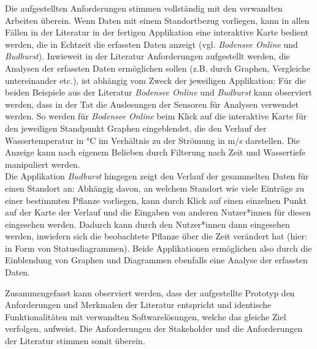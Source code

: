 Die aufgestellten Anforderungen stimmen vollständig mit den verwandten Arbeiten überein. Wenn Daten mit einem Standortbezug vorliegen, kann in allen Fällen in der Literatur in der fertigen Applikation eine interaktive Karte bedient werden, die in Echtzeit die erfassten Daten anzeigt (vgl. \textit{Bodensee Online} und \textit{Budburst}). Inwieweit in der Literatur Anforderungen aufgestellt werden, die Analysen der erfassten Daten ermöglichen sollen (z.B. durch Graphen, Vergleiche untereinander etc.), ist abhängig vom Zweck der jeweiligen Applikation: Für die beiden Beispiele aus der Literatur \textit{Bodensee Online} und \textit{Budburst} kann observiert werden, dass in der Tat die Auslesungen der Sensoren für Analysen verwendet werden. So werden für \textit{Bodensee Online} beim Klick auf die interaktive Karte für den jeweiligen Standpunkt Graphen eingeblendet, die den Verlauf der Wassertemperatur in °C im Verhältnis zu der Strömung in m/s darstellen. Die Anzeige kann nach eigenem Belieben durch Filterung nach Zeit und Wassertiefe manipuliert werden. \\ Die Applikation \textit{Budburst} hingegen zeigt den Verlauf der gesammelten Daten für einen Standort an: Abhängig davon, an welchem Standort wie viele Einträge zu einer bestimmten Pflanze vorliegen, kann durch Klick auf einen einzelnen Punkt auf der Karte der Verlauf und die Eingaben von anderen Nutzer*innen für diesen eingesehen werden. Dadurch kann durch den Nutzer*innen dann eingesehen werden, inwiefern sich die beobachtete Pflanze über die Zeit verändert hat (hier: in Form von Statusdiagrammen). Beide Applikationen ermöglichen also durch die Einblendung von Graphen und Diagrammen ebenfalls eine Analyse der erfassten Daten. 

Zusammengefasst kann observiert werden, dass der aufgestellte Prototyp den Anforderungen und Merkmalen der Literatur entspricht und identische Funktionalitäten mit verwandten Softwarelösungen, welche das gleiche Ziel verfolgen, aufweist. Die Anforderungen der Stakeholder und die Anforderungen der Literatur stimmen somit überein.

